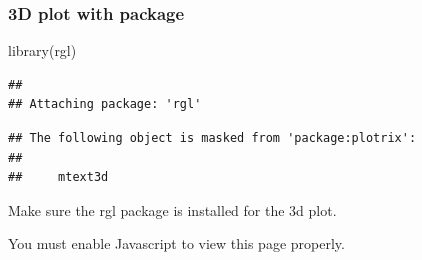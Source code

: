 \documentclass[
]{article}
\newenvironment{Shaded}{\begin{snugshade}}{\end{snugshade}}
\newcommand{\AttributeTok}[1]{\textcolor[rgb]{0.77,0.63,0.00}{#1}}
\newcommand{\DecValTok}[1]{\textcolor[rgb]{0.00,0.00,0.81}{#1}}
\newcommand{\FunctionTok}[1]{\textcolor[rgb]{0.00,0.00,0.00}{#1}}
\newcommand{\NormalTok}[1]{#1}
\newcommand{\SpecialCharTok}[1]{\textcolor[rgb]{0.00,0.00,0.00}{#1}}
\newcommand{\StringTok}[1]{\textcolor[rgb]{0.31,0.60,0.02}{#1}}
\theoremstyle{definition}
\theoremstyle{definition}
\theoremstyle{definition}
\theoremstyle{definition}
\theoremstyle{remark}
\begin{document}
\hypertarget{d-plot-with-package-1}{%
\subsubsection{\texorpdfstring{3D plot with  package}{3D plot with  package}}\label{d-plot-with-package-1}}

\begin{Shaded}
\begin{Highlighting}[]
\FunctionTok{library}\NormalTok{(rgl)}
\end{Highlighting}
\end{Shaded}

\begin{verbatim}
## 
## Attaching package: 'rgl'
\end{verbatim}

\begin{verbatim}
## The following object is masked from 'package:plotrix':
## 
##     mtext3d
\end{verbatim}

\begin{Shaded}
\end{Shaded}

Make sure the rgl package is installed for the 3d plot.

\begin{Shaded}
\end{Shaded}

\hypertarget{unnamed_chunk_91div}{}

You must enable Javascript to view this page properly.
\end{document}
